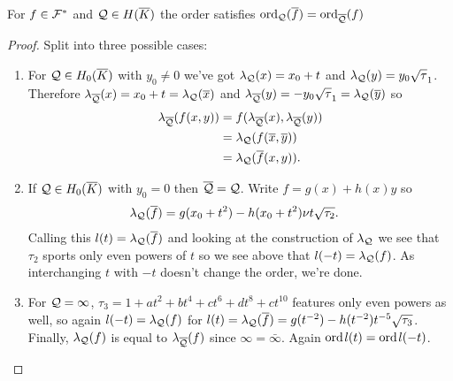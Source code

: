 \documentclass[english,11pt,a4paper]{article}
\begin{document}
\begin{lemma}\label{three}
  For $f \in \mathcal{F}^*$ and $\mathcal{Q} \in H(\overline K)$ the order satisfies $\text{ord}_{\mathcal{Q}}(\overline f) = \text{ord}_{\overline {\mathcal{Q}}} (f)$
  \begin{proof} Split into three possible cases:
    \begin{enumerate}[1.]
    	\item For $\mathcal{Q} \in H_0(\overline K)$ with $y_0 \neq 0$ we've got $\lambda_{\mathcal{Q}}(x) = x_0 + t$ and $\lambda_{\mathcal{Q}}(y) = y_0 \sqrt \tau_1$. Therefore $\lambda_{\overline {\mathcal{Q}}}(x) = x_0 + t = \lambda_{\mathcal{Q}} (\overline x)$ and $\lambda_{\overline {\mathcal{Q}}}(y) = - y_0 \sqrt \tau_1 = \lambda_{\mathcal{Q}} (\overline y)$ so
    	\begin{align*}
    	  \lambda_{\overline {\mathcal{Q}}} (f(x,y)) &= f(\lambda_{\overline {\mathcal{Q}}}(x) , \lambda_{\overline {\mathcal{Q}}}(y) ) \\
    	  							&= \lambda_{\mathcal{Q}} (f(\overline x, \overline y)) \\
    	  							&= \lambda_{\mathcal{Q}} (\overline f (x,y)).
    	\end{align*}

    	\item If $\mathcal{Q} \in H_0(\overline K)$ with $y_0 = 0$ then $\overline {\mathcal{Q}} = \mathcal{Q}$. Write $f = g(x) + h(x)y$ so
    	\begin{align*}
    	  \lambda_{\mathcal{Q}} (\overline f) &= g(x_0 + t^2) - h(x_0 + t^2) \nu t \sqrt{\tau_2}.
    	\end{align*}
    	Calling this $l(t) = \lambda_{\mathcal{Q}} (\overline f)$ and looking at the construction of $\lambda_{\mathcal{Q}}$ we see that $\tau_2$ sports only even powers of $t$ so we see above that $l(-t) = \lambda_{\mathcal{Q}} (f)$. As interchanging $t$ with $-t$ doesn't change the order, we're done.

    	\item For $\mathcal{Q} = \infty$, $\tau_3 = 1 + a t^2 + b t^4 + c t^6 + d t^8 + c t^{10}$ features only even powers as well, so again $l(-t) = \lambda_{\mathcal{Q}} (f)$ for $l(t) = \lambda_{\mathcal{Q}} (\overline f) = g(t^{-2}) - h(t^{-2}) t^{-5} \sqrt{\tau_3}$. Finally, $\lambda_{\mathcal{Q}} (f)$ is equal to $\lambda_{\overline {\mathcal{Q}}} (f)$ since $\infty = \bar \infty$. Again $\text{ord\hspace{0.4mm}} l(t) = \text{ord\hspace{0.4mm}} l(-t)$.
    \end{enumerate}
  \end{proof}
\end{lemma}
\end{document}

